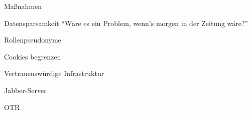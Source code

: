 \begin{frame}{Maßnahmen}
\end{frame}

\begin{frame}{Datensparsamkeit}
"`Wäre es ein Problem, wenn's morgen in der Zeitung wäre?"'
\end{frame}

\begin{frame}{Rollenpseudonyme}
\end{frame}

\begin{frame}{Cookies begrenzen}
\end{frame}

\begin{frame}{Vertrauenswürdige Infrastruktur}

Jabber-Server

OTR

\end{frame}

